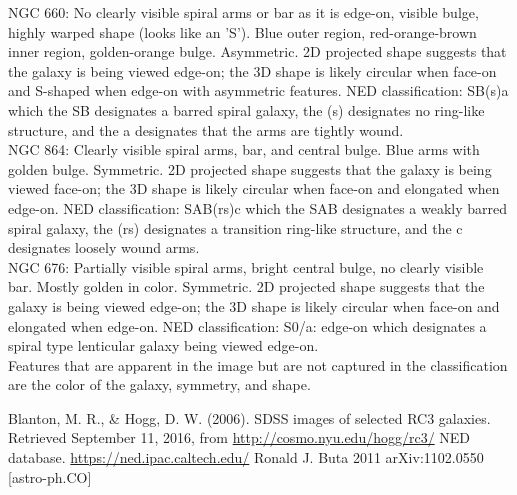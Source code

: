 \documentclass[10pt,letterpaper]{article}
\begin{document}
NGC 660: No clearly visible spiral arms or bar as it is edge-on, visible bulge, highly warped shape (looks like an 'S'). Blue outer region, red-orange-brown inner region, golden-orange bulge. Asymmetric. 2D projected shape suggests that the galaxy is being viewed edge-on; the 3D shape is likely circular when face-on and S-shaped when edge-on with asymmetric features. NED classification: SB(s)a which the SB designates a barred spiral galaxy, the (s) designates no ring-like structure, and the a designates that the arms are tightly wound.\\

NGC 864: Clearly visible spiral arms, bar, and central bulge. Blue arms with golden bulge. Symmetric. 2D projected shape suggests that the galaxy is being viewed face-on; the 3D shape is likely circular when face-on and elongated when edge-on. NED classification: SAB(rs)c which the SAB designates a weakly barred spiral galaxy, the (rs) designates a transition ring-like structure, and the c designates loosely wound arms.\\

NGC 676: Partially visible spiral arms, bright central bulge, no clearly visible bar. Mostly golden in color. Symmetric. 2D projected shape suggests that the galaxy is being viewed edge-on; the 3D shape is likely circular when face-on and elongated when edge-on. NED classification: S0/a: edge-on which designates a spiral type lenticular galaxy being viewed edge-on.\\

Features that are apparent in the image but are not captured in the classification are the color of the galaxy, symmetry, and shape.\\
\begin{thebibliography}{1}
Blanton, M. R., \& Hogg, D. W. (2006). SDSS images of selected RC3 galaxies. Retrieved September 11, 2016, from \url{http://cosmo.nyu.edu/hogg/rc3/}
 NED database. \url{https://ned.ipac.caltech.edu/}
 Ronald J. Buta 2011 arXiv:1102.0550 [astro-ph.CO]
\end{thebibliography}
\end{document}
